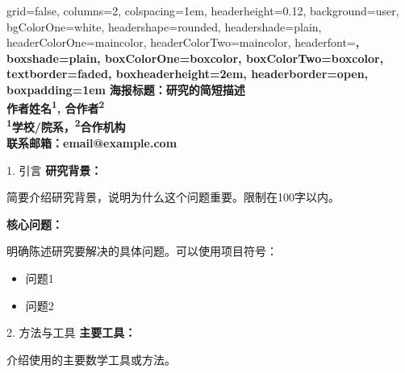 \documentclass[a0paper,portrait]{baposter}
\begin{document}
\begin{poster}{
    grid=false,
    columns=2,
    colspacing=1em,
    headerheight=0.12\textheight,
    background=user,
    bgColorOne=white,
    headershape=rounded,
    headershade=plain,
    headerColorOne=maincolor,
    headerColorTwo=maincolor,
    headerfont=\Large\bfseries\color{white},
    boxshade=plain,
    boxColorOne=boxcolor,
    boxColorTwo=boxcolor,
    textborder=faded,
    boxheaderheight=2em,
    headerborder=open,
    boxpadding=1em
}
{
    \bfseries\Huge 海报标题：研究的简短描述\\[0.3em]
    \Large 作者姓名\textsuperscript{1}, 合作者\textsuperscript{2}\\[0.2em]
    \large \textsuperscript{1}学校/院系，\textsuperscript{2}合作机构\\[0.2em]
    \normalsize 联系邮箱：email@example.com
}
{
    \begin{posterbox}{1. 引言}
        \textbf{研究背景：}

        简要介绍研究背景，说明为什么这个问题重要。限制在100字以内。

        \vspace{0.5em}

        \textbf{核心问题：}

        明确陈述研究要解决的具体问题。可以使用项目符号：
        \begin{itemize}
            \item 问题1
            \item 问题2
        \end{itemize}
    \end{posterbox}

    \begin{posterbox}{2. 方法与工具}
        \textbf{主要工具：}

        介绍使用的主要数学工具或方法。

        \vspace{0.5em}

        \begin{center}
        \end{center}


\end{posterbox}}
\end{poster}
\end{document}
